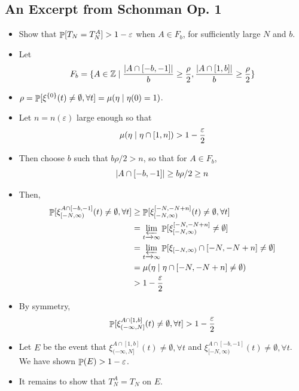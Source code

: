 \documentclass{beamer}
\newcommand{\ep}{\varepsilon}
\newcommand{\ignore}[1]{}
\newcommand{\rb}{\ignore{[}]}
\begin{document}
\subsection{An Excerpt from Schonman Op. 1}
\begin{frame}
  \begin{itemize}
    \item Show that $\Prob[T_{N} = T_{N}^{A}] > 1 - \ep$ when $A \in F_{b}$, for sufficiently large $N$ and $b$.
    \item Let
    \[F_{b} = \{A \in \mathbb{Z} \mid \frac{\abs{A \cap [-b,-1]}}{b} \geq \frac{\rho}{2}, \frac{\abs{A \cap [1,b]}}{b} \geq \frac{\rho}{2}\}\]
    \item $\rho = \mathop{\mathbb{P}}[\xi^{\{0\}}(t) \neq \emptyset, \forall t] = \mu(\eta \mid \eta(0) = 1)$.
  \end{itemize}
\end{frame}

\begin{frame}
  \begin{itemize}
    \item Let $n = n(\ep)$ large enough so that
    \[ \mu(\eta \st \eta \cap [1,n]) > 1 - \frac{\ep}{2} \]
    \item Then choose $b$ such that $b \rho/2 > n$, so that for $A \in F_{b}$, \[\abs{A \cap [-b,-1]} \geq b \rho/2 \geq n\]
    \item Then,
    \begin{align*}
      \Prob[\xi_{[-N,\infty)}^{A \cap [-b,-1]}(t) \neq \emptyset, \forall t] &\geq \Prob[\xi_{[-N,\infty)}^{[-N,-N+n]}(t) \neq \emptyset, \forall t] \\
                                                  &= \limas_{t \to \infty} \Prob[\xi_{[-N,\infty)}^{[-N,-N+n]} \neq \emptyset] \\
                                                  &= \limas_{t \to \infty} \Prob[\xi_{[-N,\infty)} \cap [-N,-N+n] \neq \emptyset] \\
                                                  &= \mu(\eta \st \eta \cap [-N,-N+n] \neq \emptyset) \\
                                                  &> 1 - \frac{\ep}{2}
    \end{align*}
  \end{itemize}
\end{frame}

\begin{frame}
  \begin{itemize}
    \item By symmetry,
    \begin{align*}
      \Prob[\xi_{(-\infty,N\rb}^{A \cap [1,b]}(t) \neq \emptyset, \forall t] > 1 - \frac{\ep}{2}
    \end{align*}
    \item Let $E$ be the event that $\xi_{(-\infty,N\rb}^{A \cap [1,b]}(t) \neq \emptyset, \forall t$ and $\xi_{[-N,\infty)}^{A \cap [-b,-1]}(t) \neq \emptyset, \forall t$. We have shown $\Prob(E) > 1 - \ep$.
    \item It remains to show that $T_{N}^{A} = T_{N}$ on $E$.
  \end{itemize}
\end{frame}
\end{document}
